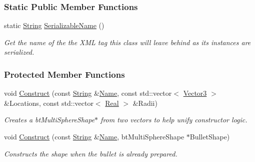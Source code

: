 \subsubsection*{Static Public Member Functions}
\begin{DoxyCompactItemize}
\item 
static \hyperlink{namespaceMezzanine_acf9fcc130e6ebf08e3d8491aebcf1c86}{String} \hyperlink{classMezzanine_1_1MultiSphereCollisionShape_a5b64cbb0b59708f6e3d21ab6b9894afa}{SerializableName} ()
\begin{DoxyCompactList}\small\item\em Get the name of the the XML tag this class will leave behind as its instances are serialized. \item\end{DoxyCompactList}\end{DoxyCompactItemize}
\subsubsection*{Protected Member Functions}
\begin{DoxyCompactItemize}
\item 
void \hyperlink{classMezzanine_1_1MultiSphereCollisionShape_ad957ea7329c1516d64eedbb867d14d6e}{Construct} (const \hyperlink{namespaceMezzanine_acf9fcc130e6ebf08e3d8491aebcf1c86}{String} \&\hyperlink{classMezzanine_1_1CollisionShape_aac524c5c56fa4d158bc071f8aecfbe79}{Name}, const std::vector$<$ \hyperlink{classMezzanine_1_1Vector3}{Vector3} $>$ \&Locations, const std::vector$<$ \hyperlink{namespaceMezzanine_a726731b1a7df72bf3583e4a97282c6f6}{Real} $>$ \&Radii)
\begin{DoxyCompactList}\small\item\em Creates a btMultiSphereShape$\ast$ from two vectors to help unify constructor logic. \item\end{DoxyCompactList}\item 
void \hyperlink{classMezzanine_1_1MultiSphereCollisionShape_ab8d05e13b83063e0fac129b1c7dfea73}{Construct} (const \hyperlink{namespaceMezzanine_acf9fcc130e6ebf08e3d8491aebcf1c86}{String} \&\hyperlink{classMezzanine_1_1CollisionShape_aac524c5c56fa4d158bc071f8aecfbe79}{Name}, btMultiSphereShape $\ast$BulletShape)
\begin{DoxyCompactList}\small\item\em Constructs the shape when the bullet is already prepared. \item\end{DoxyCompactList}\end{DoxyCompactItemize}


